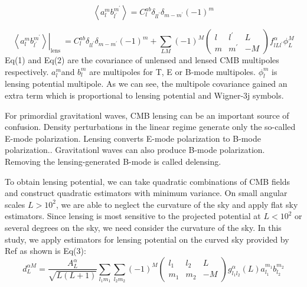 \documentclass[12pt, notitlepage, onecolumn, amsmath, amssymb, aps]{revtex4-1}
\begin{document}
\begin{equation}
  \left\langle a_{l}^{m} b_{l^{\prime}}^{m^{\prime}}\right\rangle= C_{l}^{a b} \delta_{l l^{\prime}} \delta_{m-m^{\prime}}(-1)^{m}
\end{equation}

\begin{equation}
  \left.\left\langle a_{l}^{m} b_{l^{\prime}}^{m^{\prime}}\right\rangle\right|_{\text {lens }}=C_{l}^{a b} \delta_{l l^{\prime}} \delta_{m-m^{\prime}}(-1)^{m}+\sum_{L M}(-1)^{M}\left(\begin{array}{ccc}
{l} & {l^{\prime}} & {L} \\
{m} & {m^{\prime}} & {-M}
\end{array}\right) f_{l L l^{\prime}}^{\alpha} \phi_{L}^{M}
\end{equation}
Eq(1) and Eq(2) are the covariance of unlensed and lensed CMB multipoles respectively. \(a_{l}^{m} \)and \(b_{l}^{m} \)  are multipoles for T, E or B-mode multipoles. \(\phi_{l}^{m}\) is lensing potential multipole. As we can see, the multipole covariance gained an extra term which is proportional to lensing potential and Wigner-3j symbols. 

For primordial gravitationl waves, CMB lensing can be an important source of confusion\cite{Lewis:2006fu}. Density perturbations in the linear regime generate only the so-called E-mode polarization\cite{Kamionkowski:1996ks}. Lensing converts E-mode polarization to B-mode polarization.\cite{Zaldarriaga:1998ar}. Gravitationl waves can also produce B-mode polarization\cite{Hu:2000ee}. Removing the lensing-generated B-mode is called delensing.

To obtain lensing potential, we can take quadratic combinations of CMB fields and construct quadratic estimators with minimum variance\cite{Hu:2000ee}. On small angular scales \(L>10^2\), we are able to neglect the curvature of the sky and apply flat sky estimators\cite{Hu:2001kj}. Since lensing is most sensitive to the projected potential at \(L<10^2\) or several degrees on the sky, we need consider the curvature of the sky. In this study, we apply estimators for lensing potential on the curved sky provided by Ref\cite{Okamoto:2003zw} as shown is Eq(3):
\begin{equation}
  d_{L}^{\alpha M}=\frac{A_{L}^{\alpha}}{\sqrt{L(L+1)}} \sum_{l_{1} m_{1}} \sum_{l_{2} m_{2}}(-1)^{M}\left(\begin{array}{ccc}
{l_{1}} & {l_{2}} & {L} \\
{m_{1}} & {m_{2}} & {-M}
\end{array}\right) g_{l_{1} l_{2}}^{\alpha}(L) a_{l_{1}}^{m_{1}} b_{l_{2}}^{m_{2}}
\end{equation}
\end{document}
